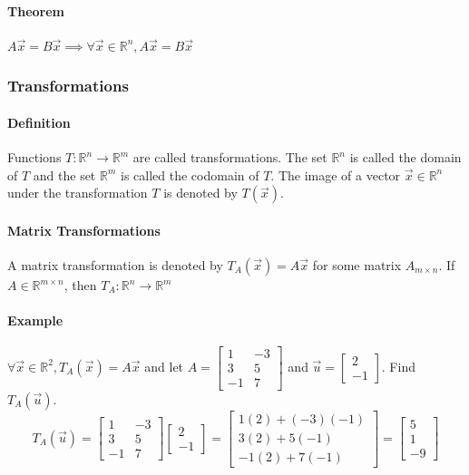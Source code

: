 \paragraph*{Theorem}
$A\vec{x} = B\vec{x} \implies \forall \vec{x} \in \mathbb{R}^n, A\vec{x} = B\vec{x}$

\hrulefill

\subsubsection*{Transformations}
\paragraph*{Definition}
Functions $T : \mathbb{R}^n \to \mathbb{R}^m$ are called transformations. 
The set $\mathbb{R}^n$ is called the domain of $T$ and the set $\mathbb{R}^m$ is called the codomain of $T$. 
The image of a vector $\vec{x} \in \mathbb{R}^n$ under the transformation $T$ is denoted by $T(\vec{x})$. 

\paragraph*{Matrix Transformations}
A matrix transformation is denoted by $T_A(\vec{x}) = A\vec{x}$ for some matrix $A_{m \times n}$. If $A \in \mathbb{R}^{m \times n}$, then $T_A : \mathbb{R}^n \to \mathbb{R}^m$

\paragraph*{Example} $\forall \vec{x} \in \mathbb{R}^2, T_A(\vec{x}) = A\vec{x}$ and let $A = \begin{bmatrix}
    1 & -3 \\
    3 & 5 \\
    -1 & 7
\end{bmatrix}$ and $\vec{u} = \begin{bmatrix} 2 \\ -1 \end{bmatrix}$. Find $T_A(\vec{u})$.
\[
T_A(\vec{u}) = \begin{bmatrix}
    1 & -3 \\
    3 & 5 \\
    -1 & 7
\end{bmatrix} \begin{bmatrix} 2 \\ -1 \end{bmatrix} = \begin{bmatrix} 1(2) + (-3)(-1) \\ 3(2) + 5(-1) \\ -1(2) + 7(-1) \end{bmatrix} = \begin{bmatrix} 5 \\ 1 \\ -9 \end{bmatrix}
\]

